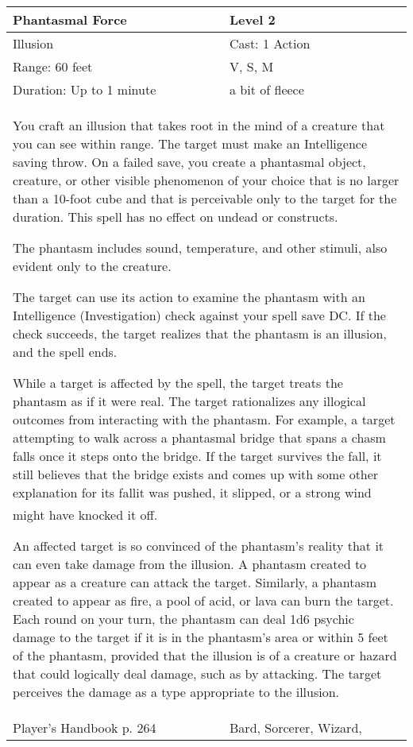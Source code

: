 \documentclass[11pt]{report}
\begin{document}
\begin{table}[H]
	\begin{tabular}{||p{6cm}|p{6cm}||}
		\hline\hline
		\bf{Phantasmal Force} & Level 2\\ \hline
		Illusion & Cast: 1 Action\\ \hline
		Range: 60 feet & V, S, M\\ \hline
		Duration: Up to 1 minute & a bit of fleece\\ \hline
		\multicolumn{2}{||p{12cm}||}{You craft an illusion that takes root in the mind of a creature that you can see within range.
The target must make an Intelligence saving throw. On a failed save, you create a phantasmal object, creature, or other visible phenomenon of your choice that is no larger than a 10-foot cube and that is perceivable only to the target for the duration. This spell has no effect on undead or constructs.

The phantasm includes sound, temperature, and other stimuli, also evident only to the creature.

The target can use its action to examine the phantasm with an Intelligence (Investigation) check against your spell save DC. If the check succeeds, the target realizes that the phantasm is an illusion, and the spell ends.

While a target is affected by the spell, the target treats the phantasm as if it were real. The target rationalizes any illogical outcomes from interacting with the phantasm. For example, a target attempting to walk across a phantasmal bridge that spans a chasm falls once it steps onto the bridge. If the target survives the fall, it still believes that the bridge exists and comes up with some other explanation for its fallit was pushed, it slipped, or a strong wind might have knocked it off.

An affected target is so convinced of the phantasm’s reality that it can even take damage from the illusion. A phantasm created to appear as a creature can attack the target. Similarly, a phantasm created to appear as fire, a pool of acid, or lava can burn the target. Each round on your turn, the phantasm can deal 1d6 psychic damage to the target if it is in the phantasm’s area or within 5 feet of the phantasm, provided that the illusion is of a creature or hazard that could logically deal damage, such as by attacking. The target perceives the damage as a type appropriate to the illusion.}\\ \hline
Player's Handbook p. 264 & Bard, Sorcerer, Wizard, \\ \hline\hline
	\end{tabular}
\end{table}
\end{document}
